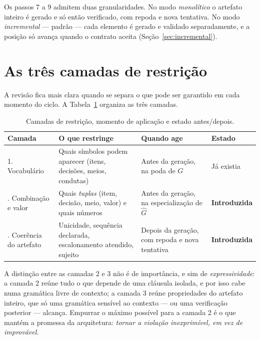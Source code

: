 \documentclass[11pt,a4paper]{article}
\begin{document}
Os passos 7 a 9 admitem duas granularidades. No modo \emph{monolítico} o
artefato inteiro é gerado e só então verificado, com repoda e nova tentativa. No
modo \emph{incremental} --- padrão --- cada elemento é gerado e validado
separadamente, e a posição só avança quando o contrato aceita
(Seção~\ref{sec:incremental}).

\section{As três camadas de restrição}

A revisão fica mais clara quando se separa o que pode ser garantido em cada
momento do ciclo. A Tabela~\ref{tab:camadas} organiza as três camadas.

\begin{table}[h]
\centering
\small
\caption{Camadas de restrição, momento de aplicação e estado antes/depois.}
\label{tab:camadas}
\begin{tabular}{@{}p{2.6cm}p{4.6cm}p{3.2cm}p{4.0cm}@{}}
\toprule
\textbf{Camada} & \textbf{O que restringe} & \textbf{Quando age} & \textbf{Estado} \\
\midrule
1. Vocabulário &
Quais símbolos podem aparecer (itens, decisões, meios, condutas) &
Antes da geração, na poda de $G$ &
Já existia \\
\addlinespace
2. Combinação e valor &
Quais \emph{tuplas} (item, decisão, meio, valor) e quais números &
Antes da geração, na especialização de $\hat{G}$ &
\textbf{Introduzida} \\
\addlinespace
3. Coerência do artefato &
Unicidade, sequência declarada, escalonamento atendido, sujeito &
Depois da geração, com repoda e nova tentativa &
\textbf{Introduzida} \\
\bottomrule
\end{tabular}
\end{table}

A distinção entre as camadas 2 e 3 não é de importância, e sim de
\emph{expressividade}: a camada 2 reúne tudo o que depende de uma cláusula
isolada, e por isso cabe numa gramática livre de contexto; a camada 3 reúne
propriedades do artefato inteiro, que só uma gramática sensível ao contexto
--- ou uma verificação posterior --- alcança. Empurrar o máximo possível para a
camada 2 é o que mantém a promessa da arquitetura: \emph{tornar a violação
inexprimível, em vez de improvável}.
\end{document}

